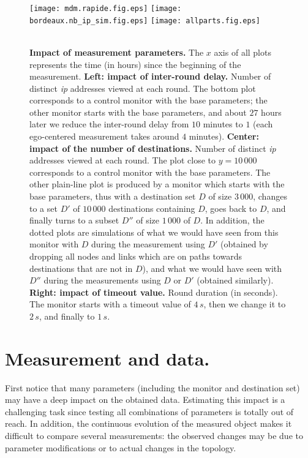 \documentclass[times, 10pt,twocolumn]{article}
\newcommand{\myscale}{0.48}
\newcommand{\axes}[3]{\mbox{ }\hfill \scalebox{0.7}{\em #1} 
  \hfill \mbox{ } \hfill \scalebox{0.7}{\em #2} 
  \hfill \mbox{ } \hfill \scalebox{0.7}{\em #3} \hfill \mbox{ } \vskip -0.2cm}
\newcommand{\ip}{\mbox{\em \sc ip}}
\begin{document}
\begin{figure*}[!ht]
\centering
\texttt{[image: mdm.rapide.fig.eps]}
\texttt{[image: bordeaux.nb\_ip\_sim.fig.eps]}
\texttt{[image: allparts.fig.eps]}\\
\axes{\ \ \ \ \ \ \ \ \ \ \  \hspace{1cm}$x$ = hours; $y$ = \# ip}{\ \ \ \ \ \ \ \ \hspace{2.5cm} \em $x$ = hours; $y$ = \# ip}{\ \ \ \hspace{2cm} $x$ = hours; $y$ = round duration (s)}
\caption{
{\bf Impact of measurement parameters.} 
The $x$ axis of all plots represents the time (in hours) since the beginning of the measurement.
{\bf Left: impact of inter-round delay.} Number of distinct \ip{} addresses viewed at each round. The bottom plot corresponds to a control monitor with the base parameters; the other monitor starts with the base parameters, and about $27$ hours later we reduce the inter-round delay from $10$ minutes to $1$ (each ego-centered measurement takes around $4$ minutes).
{\bf Center: impact of the number of destinations.} Number of distinct \ip{} addresses viewed at each round.
The plot close to $y=10\,000$ corresponds to a control monitor with the base parameters. The other plain-line plot is produced by a monitor which starts with the base parameters, thus with a destination set $D$ of size $3\,000$, changes to a set $D'$ of $10\,000$ destinations containing $D$, 
goes back to $D$,
and finally turns to a subset $D''$ of size $1\,000$ of $D$.
In addition, the dotted plots are simulations of what we would have seen from this monitor with $D$ during the measurement using $D'$ (obtained by dropping all nodes and links which are on paths towards destinations that are not in $D$), and what we would have seen with $D''$ during the measurements using $D$ or $D'$ (obtained similarly).
{\bf Right: impact of timeout value.} Round duration (in seconds). 
The monitor starts with a timeout value of $4\,s$, then we change it to $2\,s$, and finally to $1\,s$.
}
\label{fig_speed_up}
\label{fig_nb_dest}
\end{figure*}

\section{Measurement and data.}
\label{sec_data}



First notice that many parameters (including the monitor and destination set) may have a deep impact on the obtained data. Estimating this impact is a challenging task since testing all combinations of parameters is totally out of reach. In addition, the continuous evolution of the measured object makes it difficult to compare several measurements: the observed changes may be due to parameter modifications or to actual changes in the topology.
\end{document}
